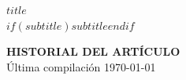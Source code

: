 \begin{center}
\vspace*{2em}
{\LARGE \textbf{$title$}}\\[1em]
{\large $if(subtitle)$$subtitle$$endif$}\\[3em]
\end{center}

\noindent\textbf{HISTORIAL DEL ARTÍCULO}\\
Última compilación \today

\vspace{1.5em}
